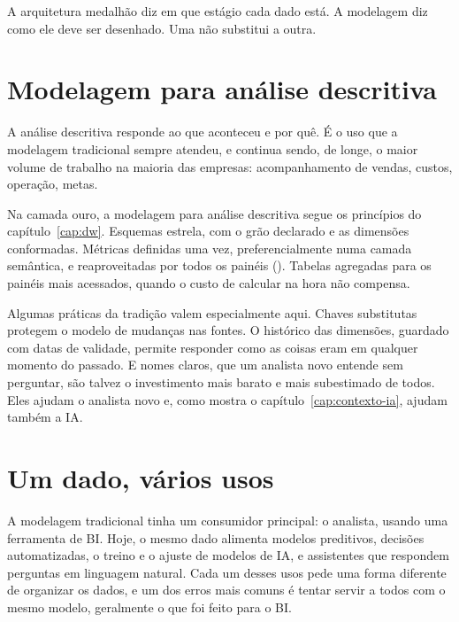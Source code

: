 \begin{destaque}
A arquitetura medalhão diz em que estágio cada dado está. A modelagem diz como ele deve ser
desenhado. Uma não substitui a outra.
\end{destaque}


\section{Modelagem para análise descritiva}
\label{sec:modelagem-descritiva}

A análise descritiva responde ao que aconteceu e por quê. É o uso que a modelagem
tradicional sempre atendeu, e continua sendo, de longe, o maior volume de trabalho na
maioria das empresas: acompanhamento de vendas, custos, operação, metas.

Na camada ouro, a modelagem para análise descritiva segue os princípios do
capítulo~\ref{cap:dw}. Esquemas estrela, com o grão declarado e as dimensões conformadas.
Métricas definidas uma vez, preferencialmente numa camada semântica, e reaproveitadas por
todos os painéis (). Tabelas agregadas para os painéis mais
acessados, quando o custo de calcular na hora não compensa.

Algumas práticas da tradição valem especialmente aqui. Chaves substitutas protegem o modelo
de mudanças nas fontes. O histórico das dimensões, guardado com datas de validade, permite
responder como as coisas eram em qualquer momento do passado. E nomes claros, que um
analista novo entende sem perguntar, são talvez o investimento mais barato e mais
subestimado de todos. Eles ajudam o analista novo e, como mostra o
capítulo~\ref{cap:contexto-ia}, ajudam também a IA.

\section{Um dado, vários usos}
\label{sec:um-dado-varios-usos}

A modelagem tradicional tinha um consumidor principal: o analista, usando uma ferramenta de
BI. Hoje, o mesmo dado alimenta modelos preditivos, decisões automatizadas, o treino e o
ajuste de modelos de IA, e assistentes que respondem perguntas em linguagem natural. Cada
um desses usos pede uma forma diferente de organizar os dados, e um dos erros mais comuns é
tentar servir a todos com o mesmo modelo, geralmente o que foi feito para o BI.

